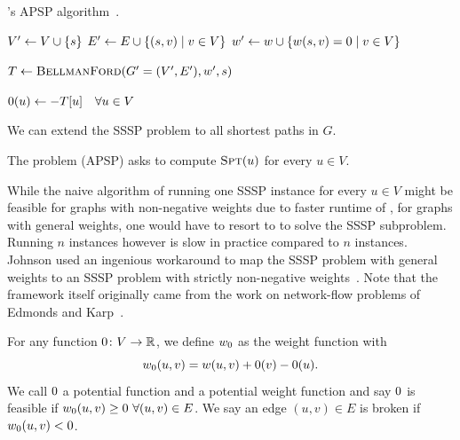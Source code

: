 \begin{algorithm}[t]
  \caption{
    \algjs's APSP algorithm~\cite{DBLP:journals/jacm/Johnson77}. 
  }
  \label{algo:johnson}

  
  \BlankLine
  $V' \gets V \cup \left\{s\right\}$\;
  $E' \gets E \cup \left\{(s, v) \mid v \in V\right\}$\;
  $w' \gets w \cup \left\{w(s, v) = 0 \mid v \in V\right\}$\;
  
  \BlankLine
  $T \gets \textsc{BellmanFord}(G' = (V', E'), w', s)$\;

  \BlankLine
  $\pot(u) \gets -T[u]\quad\forall u \in V$\;



\end{algorithm}

We can extend the SSSP problem to all shortest paths in $G$.

\begin{definition}
  The \apsp problem (APSP) asks to compute $\textsc{Spt}(u)$ for every $u \in V$.
\end{definition}

\noindent While the naive algorithm of running one SSSP instance for every $u \in V$ might be feasible for graphs with non-negative weights due to faster runtime of \algdk, for graphs with general weights, one would have to resort to \algbf to solve the SSSP subproblem.
Running $n$ \algbf instances however is slow in practice compared to $n$ \algdk instances.
Johnson used an ingenious workaround to map the SSSP problem with general weights to an SSSP problem with strictly non-negative weights~\cite{DBLP:journals/jacm/Johnson77}.
Note that the framework itself originally came from the work on network-flow problems of Edmonds and Karp~\cite{PotentialsOriginal}.

\begin{definition}\label{def:potentials}
  For any function $\pot\colon V \rightarrow \sR$, we define $\wpot$ as the weight function with \[
    \wpot(u, v) = w(u, v) + \pot(v) - \pot(u).
  \] We call $\pot$ a potential function and \wpot a potential weight function and say $\pot$ is feasible if $\wpot(u, v) \geq 0\,\,\forall(u, v) \in E$.
  We say an edge $(u, v) \in E$ is broken if $\wpot(u, v) < 0$. 
\end{definition}

